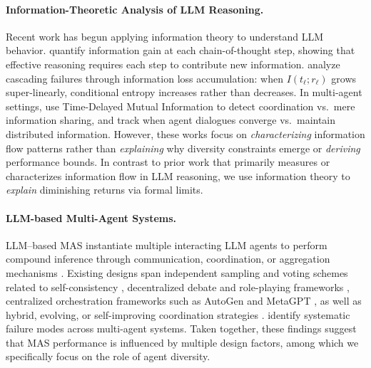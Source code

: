 \documentclass{article}
\theoremstyle{plain}
\theoremstyle{definition}
\theoremstyle{remark}
\begin{document}
\paragraph{Information-Theoretic Analysis of LLM Reasoning.}
Recent work has begun applying information theory to understand LLM behavior. \citet{ton2024understanding} quantify information gain at each chain-of-thought step, showing that effective reasoning requires each step to contribute new information. \citet{gan2025rethinking} analyze cascading failures through information loss accumulation: when $I(t_\ell; r_\ell)$ grows super-linearly, conditional entropy increases rather than decreases. In multi-agent settings, \citet{riedl2025emergent} use Time-Delayed Mutual Information to detect coordination vs.~mere information sharing, and \citet{chang2025multi} track when agent dialogues converge vs.~maintain distributed information. 
However, these works focus on \emph{characterizing} information flow patterns rather than \emph{explaining} why diversity constraints emerge or \emph{deriving} performance bounds. In contrast to prior work that primarily measures or characterizes information flow in LLM reasoning, we use information theory to \emph{explain} diminishing returns via formal limits.

\vspace{-0.3cm}
\paragraph{LLM-based Multi-Agent Systems.}
LLM–based MAS instantiate multiple interacting LLM agents to perform compound inference through communication, coordination, or aggregation mechanisms \citep{xi2023risepotentiallargelanguage,wang2024a,guo2024large}. Existing designs span independent sampling and voting schemes related to self-consistency \cite{wang2023selfconsistencyimproveschainthought}, decentralized debate and role-playing frameworks \cite{du2023improvingfactualityreasoninglanguage,10.5555/3692070.3693020,li-etal-2024-improving-multi,li2024agentsneed,camel}, centralized orchestration frameworks such as AutoGen \cite{wu2024autogen} and MetaGPT \cite{hong2024metagptmetaprogrammingmultiagent}, as well as hybrid, evolving, or self-improving coordination strategies \cite{dang2025multiagent,zhao2025sirius}. \citet{cemri2025why} identify systematic failure modes across multi-agent systems. Taken together, these findings suggest that MAS performance is influenced by multiple design factors, among which we specifically focus on the role of agent diversity.
\end{document}
